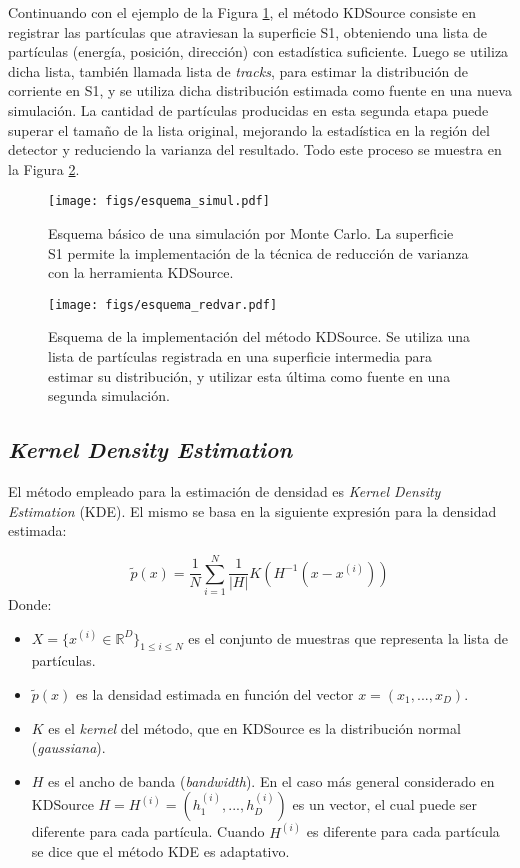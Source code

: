 Continuando con el ejemplo de la Figura \ref{fig:esq_mc}, el método KDSource consiste en registrar las partículas que atraviesan la superficie S1, obteniendo una lista de partículas (energía, posición, dirección) con estadística suficiente. Luego se utiliza dicha lista, también llamada lista de \emph{tracks}, para estimar la distribución de corriente en S1, y se utiliza dicha distribución estimada como fuente en una nueva simulación. La cantidad de partículas producidas en esta segunda etapa puede superar el tamaño de la lista original, mejorando la estadística en la región del detector y reduciendo la varianza del resultado. Todo este proceso se muestra en la Figura \ref{fig:esq_rv}. 

\begin{figure}[h!]
    \centering
    \texttt{[image: figs/esquema\_simul.pdf]}
    \caption{Esquema básico de una simulación por Monte Carlo. La superficie S1 permite la implementación de la técnica de reducción de varianza con la herramienta KDSource.}
    \label{fig:esq_mc}
\end{figure}

\begin{figure}[htbp!]
    \centering
    \texttt{[image: figs/esquema\_redvar.pdf]}
    \caption{Esquema de la implementación del método KDSource. Se utiliza una lista de partículas registrada en una superficie intermedia para estimar su distribución, y utilizar esta última como fuente en una segunda simulación.}
    \label{fig:esq_rv}
\end{figure}


\subsection{\emph{Kernel Density Estimation}}
\label{subsec:kde}

El método empleado para la estimación de densidad es \emph{Kernel Density Estimation} (KDE). El mismo se basa en la siguiente expresión para la densidad estimada:

\begin{equation}
    \tilde{p}(x) = \frac{1}{N} \sum_{i=1}^N \frac{1}{|H|} K(H^{-1} (x-x^{(i)}))
    \label{eq:KDE}
\end{equation}
Donde:
\begin{itemize}
    \item $X = \{x^{(i)} \in \mathbb{R}^D\}_{1\leq i \leq N}$ es el conjunto de muestras que representa la lista de partículas.
    \item $\tilde{p}(x)$ es la densidad estimada en función del vector $x=(x_1,...,x_D)$.
    \item $K$ es el \emph{kernel} del método, que en KDSource es la distribución normal (\emph{gaussiana}).
    \item $H$ es el ancho de banda (\emph{bandwidth}). En el caso más general considerado en KDSource $H=H^{(i)}=(h_1^{(i)},...,h_D^{(i)})$ es un vector, el cual puede ser diferente para cada partícula. Cuando $H^{(i)}$ es diferente para cada partícula se dice que el método KDE es adaptativo.
\end{itemize}

